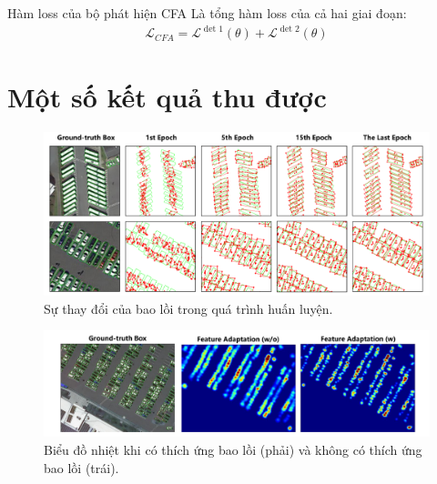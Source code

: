 \documentclass[11pt]{beamer}
\theoremstyle{definition}
\theoremstyle{plain}
\theoremstyle{plain}
\theoremstyle{remark}
\begin{document}
	\begin{frame}{Hàm loss của bộ phát hiện CFA}
		Là tổng hàm loss của cả hai giai đoạn:
		\begin{align}
			\mathcal{L}_{CFA} = \mathcal{L}^{\operatorname{det} 1}(\theta)+\mathcal{L}^{\operatorname{det} 2}(\theta)
		\end{align}
		
	\end{frame}
	\section{Một số kết quả thu được}
	\begin{frame}
		
\begin{figure}
	\centering
	\includegraphics[width=1\linewidth]{convex_hull_evolution_during_training}
	\caption{Sự thay đổi của bao lồi trong quá trình huấn luyện.}
	\label{fig:convexhullevolutionduringtraining}
\end{figure}
	\end{frame}
	\begin{frame}
		\begin{figure}
			\centering
			\includegraphics[width=1\linewidth]{heat_map_comparision_of_CFA}
			\caption{Biểu đồ nhiệt khi có thích ứng bao lồi (phải) và không có thích ứng bao lồi (trái).}
			\label{fig:heatmapcomparisionofcfa}
		\end{figure}
		
	\end{frame}
\end{document}
